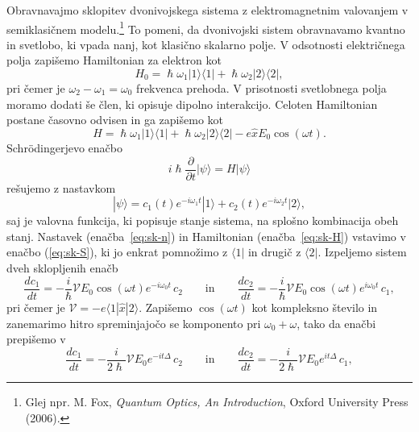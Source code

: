 Obravnavajmo sklopitev dvonivojskega sistema z elektromagnetnim valovanjem 
v semiklasičnem modelu.\footnote{Glej npr. M. Fox, {\it Quantum Optics, 
An Introduction}, Oxford University Press (2006).} 
To pomeni, da dvonivojski sistem obravnavamo kvantno in 
svetlobo, ki vpada nanj, kot klasično skalarno polje. 
V odsotnosti električnega polja zapišemo Hamiltonian za elektron kot
\begin{equation}
H_0 = \hslash \omega_1 |1\rangle \langle1| + \hslash \omega_2 |2\rangle \langle2|,
\end{equation}
pri čemer je $\omega_2- \omega_1 = \omega_0$ frekvenca prehoda. V prisotnosti 
svetlobnega polja moramo dodati še člen, ki opisuje dipolno interakcijo. Celoten
Hamiltonian postane časovno odvisen in ga zapišemo kot
\begin{equation}
H = \hslash \omega_1 |1\rangle \langle1| + \hslash \omega_2 |2\rangle \langle2|
-e\hat{x}E_0 \cos (\omega t).
\label{eq:sk-H}
\end{equation}
Schr\"odingerjevo enačbo
\begin{equation}
i \hslash \frac{\partial}{\partial t}|\psi\rangle = H|\psi\rangle
\label{eq:sk-S}
\end{equation}
rešujemo z nastavkom
\begin{equation}
|\psi\rangle = c_1(t)e^{-i \omega_1t}|1\rangle + c_2(t)e^{-i \omega_2t}|2\rangle,
\label{eq:sk-n}
\end{equation}
saj je valovna funkcija, ki popisuje stanje sistema, na splošno
kombinacija obeh stanj. Nastavek (enačba~\ref{eq:sk-n}) in Hamiltonian 
(enačba~\ref{eq:sk-H}) vstavimo v enačbo (\ref{eq:sk-S}), ki jo enkrat pomnožimo 
z $\langle1|$ in drugič z $\langle2|$. Izpeljemo sistem dveh sklopljenih enačb
\begin{equation}
\frac{d c_1}{dt}=-\frac{i}{\hslash} \mathcal{V} E_0\cos (\omega t) e^{-i\omega_0 t}\, c_2 
\qquad \mathrm{in} \qquad
\frac{d c_2}{dt}=-\frac{i}{\hslash} \mathcal{V} E_0\cos (\omega t) e^{i\omega_0 t}\, c_1,
\label{eq:c1c2}
\end{equation}
pri čemer je $\mathcal{V} = -e\langle1|\hat{x}|2\rangle$. Zapišemo $\cos(\omega t)$ kot
kompleksno število in zanemarimo hitro spreminjajočo se komponento pri $\omega_0 + \omega$,
tako da enačbi prepišemo v 
\begin{equation}
\frac{d c_1}{dt}=-\frac{i}{2\hslash} \mathcal{V} E_0 e^{-it\Delta}\, c_2 
\qquad \mathrm{in} \qquad
\frac{d c_2}{dt}=-\frac{i}{2\hslash} \mathcal{V} E_0 e^{it\Delta}\, c_1,
\label{eq:rabi2}
\end{equation}
